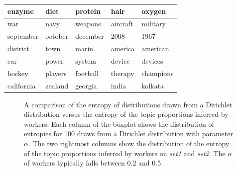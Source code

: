 \begin{table}
{\begin{tabular}{|lllll}
  enzyme & diet & protein & hair & oxygen \\ \hline 
  war & navy & weapons & aircraft & military \\ \hline 
  september & october & december & 2008 & 1967 \\ \hline 
  district & town & marin & america & american \\ \hline 
  car & power & system & device & devices \\ \hline 
  hockey & players & football & therapy & champions \\ \hline 
  california & zealand & georgia & india & kolkata \\
\end{tabular}
}
\vspace{0.2in}
\end{table}

\begin{figure}
\centering
{}%

\caption{A comparison of the entropy of distributions drawn from a
  Dirichlet distribution versus the entropy of the topic proportions
  inferred by workers.  Each column of the boxplot shows the
  distribution of entropies for 100 draws from a Dirichlet
  distribution with parameter $\alpha$.  The two rightmost columns
  show the distribution of the entropy of the topic proportions
  inferred by workers on \emph{set1} and \emph{set2}.  The $\alpha$ of
  workers typically falls between 0.2 and 0.5.}

\label{fig:entropy}
\end{figure}

